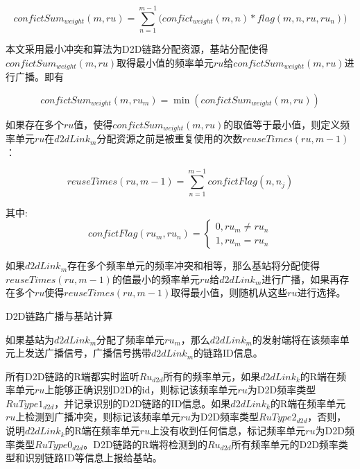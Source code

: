 \documentclass[figurelist,tablelist,algorithmlist,nomlist,masters]{seuthesix}
\begin{document}
\begin{enumerate}
	\begin{equation}\label{eq2.1}
	confictSu{m_{weight}}(m,ru) = \sum\limits_{n = 1}^{m - 1} {(confic{t_{weight}}(m,n)} *flag(m,n,ru,r{u_n}))
	\end{equation}
	
	本文采用最小冲突和算法为D2D链路分配资源，基站分配使得$confictSu{m_{weight}}(m,ru)$取得最小值的频率单元$ru$给$confictSu{m_{weight}}(m,ru)$进行广播。即有
	
	\begin{equation}\label{eq2.1}
	confictSu{m_{weight}}(m,r{u_m}) = \min (confictSu{m_{weight}}(m,ru))
	\end{equation}
	
	如果存在多个$ru$值，使得$confictSu{m_{weight}}(m,ru)$的取值等于最小值，则定义频率单元$ru$在$d2dLin{k_m}$分配资源之前是被重复使用的次数$reuseTimes(ru,m - 1)$：
	
	\begin{equation}\label{eq2.1}
	reuseTimes(ru,m - 1) = \sum\limits_{n = 1}^{m - 1} {confictFlag(n,{n_j})}
	\end{equation}
	
	其中:
	\begin{equation}\label{eq2.1}
	confictFlag(r{u_m},r{u_n}) = \left\{ \begin{array}{l}
	0,r{u_m} \ne r{u_n}\\
	1,r{u_m} = r{u_n}
	\end{array} \right.
	\end{equation}
	
	如果$d2dLin{k_m}$存在多个频率单元的频率冲突和相等，那么基站将分配使得$reuseTimes(ru,m - 1)$的值最小的频率单元$ru$给$d2dLin{k_m}$进行广播，如果再存在多个$ru$使得$reuseTimes(ru,m - 1)$取得最小值，则随机从这些$ru$进行选择。
	
	
	D2D链路广播与基站计算
	
	
	如果基站为$d2dLin{k_m}$分配了频率单元$r{u_m}$，那么$d2dLin{k_m}$的发射端将在该频率单元上发送广播信号，广播信号携带$d2dLin{k_m}$的链路ID信息。
	
	所有D2D链路的R端都实时监听$R{u_{d2d}}$所有的频率单元，如果$d2dLin{k_k}$的R端在频率单元$ru$上能够正确识别D2D的id，则标记该频率单元$ru$为D2D频率类型$RuType{1_{d2d}}$，并记录识别的D2D链路的ID信息。如果$d2dLin{k_k}$的R端在频率单元$ru$上检测到广播冲突，则标记该频率单元$ru$为D2D频率类型$RuType{2_{d2d}}$，否则，说明$d2dLin{k_k}$的R端在频率单元$ru$上没有收到任何信息，标记频率单元$ru$为D2D频率类型$RuType{0_{d2d}}$。D2D链路的R端将检测到的$R{u_{d2d}}$所有频率单元的D2D频率类型和识别链路ID等信息上报给基站。
	

\end{enumerate}
\end{document}
